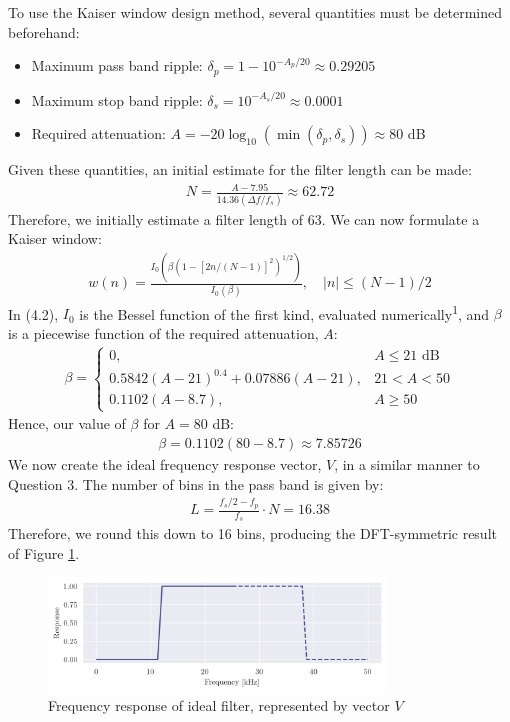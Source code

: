 To use the Kaiser window design method, several quantities must be determined beforehand:
\begin{itemize}
    \item Maximum pass band ripple: $\delta_p = 1 - 10^{-A_p / 20} \approx 0.29205$
    \item Maximum stop band ripple: $\delta_s = 10^{-A_s / 20} \approx 0.0001$
    \item Required attenuation: $A = -20\log_{10}(\min(\delta_p, \delta_s)) \approx 80$ dB
\end{itemize}
Given these quantities, an initial estimate for the filter length can be made:
\begin{align}
    N = \frac{A - 7.95}{14.36(\Delta f / f_s)} \approx 62.72
\end{align}
Therefore, we initially estimate a filter length of 63. We can now formulate a Kaiser window:
\begin{align}
    w(n) = \frac{I_0(\beta(1 - [2n/(N-1)]^2)^{1/2})}{I_0(\beta)}, \quad |n| \leq (N-1)/2
\end{align}
In (4.2), $I_0$ is the Bessel function of the first kind, evaluated numerically\textsuperscript{1}, and $\beta$ is a piecewise function of the required attenuation, $A$:
\begin{align}
    \beta = \begin{cases}
        0, & A \leq 21 \text{ dB} \\
        0.5842(A - 21)^{0.4} + 0.07886(A - 21), & 21 < A < 50 \\
        0.1102(A - 8.7), & A \geq 50
    \end{cases}
\end{align}
Hence, our value of $\beta$ for $A=80$ dB:
\begin{align}
    \beta = 0.1102(80 - 8.7) \approx 7.85726
\end{align}
We now create the ideal frequency response vector, $V$, in a similar manner to Question 3. The number of bins in the pass band is given by:
\begin{align}
    L = \frac{f_s/2 - f_p}{f_s} \cdot N = 16.38
\end{align}
Therefore, we round this down to 16 bins, producing the DFT-symmetric result of Figure \ref{fig:q4_ideal_freqz}.

\newpage

\begin{figure}[ht]
    \centering
    \includegraphics[width=0.8\textwidth]{images/q4_ideal_freqz.png}
    \caption{Frequency response of ideal filter, represented by vector $V$}
    \label{fig:q4_ideal_freqz}
\end{figure}

